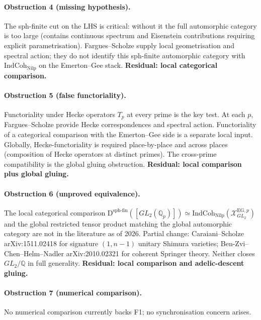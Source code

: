 \paragraph{Obstruction 4 (missing hypothesis).} The sph-finite cut on the
LHS is critical: without it the full automorphic category is too
large (contains continuous spectrum and Eisenstein contributions
requiring explicit parametrisation). Fargues--Scholze supply local
geometrisation and spectral action; they do not identify this
sph-finite automorphic category with
\(\mathrm{IndCoh}_{\mathrm{Nilp}}\) on the Emerton--Gee stack.
\textbf{Residual: local categorical comparison.}

\paragraph{Obstruction 5 (false functoriality).} Functoriality under
Hecke operators \(T_{p}\) at every prime is the key test. At each
\(p\), Fargues--Scholze provide Hecke correspondences and spectral
action. Functoriality of a categorical comparison with the
Emerton--Gee side is a separate local input. Globally,
Hecke-functoriality is required place-by-place and across places
(composition of Hecke operators at distinct primes). The cross-prime
compatibility is the global gluing obstruction. \textbf{Residual:
local comparison plus global gluing.}

\paragraph{Obstruction 6 (unproved equivalence).} The local categorical
comparison
\(\mathrm{D}^{\mathrm{sph\text{-}fin}}([GL_{2}(\mathbb{Q}_{p})])
\simeq
\mathrm{IndCoh}_{\mathrm{Nilp}}(\mathcal{X}^{\mathrm{EG},p}_{GL_{2}})\)
and the global restricted tensor product matching the global
automorphic category are not in the literature as of 2026. Partial
change: Caraiani--Scholze
arXiv:1511.02418 for signature \((1,n-1)\) unitary Shimura varieties;
Ben-Zvi--Chen--Helm--Nadler arXiv:2010.02321 for coherent Springer
theory. Neither closes \(GL_{2}/\mathbb{Q}\) in full generality.
\textbf{Residual: local comparison and adelic-descent gluing.}

\paragraph{Obstruction 7 (numerical comparison).} No numerical comparison
currently backs F1; no synchronisation concern arises.

